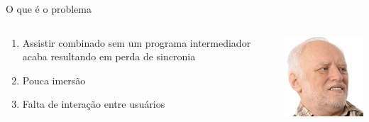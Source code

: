 \documentclass[12pt]{beamer}
\begin{document}
\begin{frame}{O que é o problema}
    \begin{columns}
        \begin{column}{0.65\textwidth}
            \begin{enumerate}[label=•]
                \item Assistir combinado sem um programa intermediador acaba resultando em perda de sincronia
                \item Pouca imersão
                \item Falta de interação entre usuários
            \end{enumerate}
            
        \end{column}
        \begin{column}{0.35\textwidth}
            \begin{center}
                \includegraphics[width=1\textwidth]{figuras/harolddesgosto}
             \end{center}
        \end{column}
    \end{columns}
\end{frame}
\end{document}
